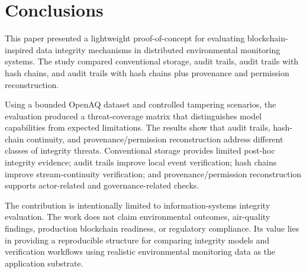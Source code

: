 \section{Conclusions}

This paper presented a lightweight proof-of-concept for evaluating blockchain-inspired data integrity mechanisms in distributed environmental monitoring systems. The study compared conventional storage, audit trails, audit trails with hash chains, and audit trails with hash chains plus provenance and permission reconstruction.

Using a bounded OpenAQ dataset and controlled tampering scenarios, the evaluation produced a threat-coverage matrix that distinguishes model capabilities from expected limitations. The results show that audit trails, hash-chain continuity, and provenance/permission reconstruction address different classes of integrity threats. Conventional storage provides limited post-hoc integrity evidence; audit trails improve local event verification; hash chains improve stream-continuity verification; and provenance/permission reconstruction supports actor-related and governance-related checks.

The contribution is intentionally limited to information-systems integrity evaluation. The work does not claim environmental outcomes, air-quality findings, production blockchain readiness, or regulatory compliance. Its value lies in providing a reproducible structure for comparing integrity models and verification workflows using realistic environmental monitoring data as the application substrate.
